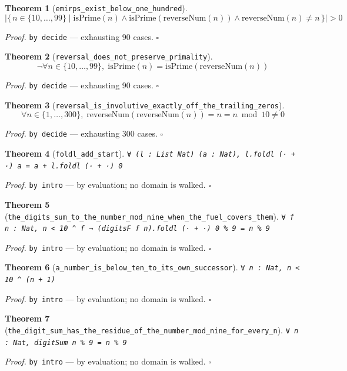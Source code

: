\documentclass[11pt]{article}
\newtheorem{theorem}{Theorem}[section]
\begin{document}
\begin{theorem}[\texttt{emirps\_exist\_below\_one\_hundred}]
\[ \left|\{\, n \in \{10,\dots,99\} \mid \mathrm{isPrime}\mathopen{}\left(n\right) \land \mathrm{isPrime}\mathopen{}\left(\mathrm{reverseNum}\mathopen{}\left(n\right)\right) \land \mathrm{reverseNum}\mathopen{}\left(n\right) \neq n \,\}\right| > 0 \]
\end{theorem}
\noindent\emph{Proof.} \texttt{by decide} --- exhausting 90 cases. \hfill$\square$

\begin{theorem}[\texttt{reversal\_does\_not\_preserve\_primality}]
\[ \lnot \forall n \in \{10,\dots,99\},\; \mathrm{isPrime}\mathopen{}\left(n\right) = \mathrm{isPrime}\mathopen{}\left(\mathrm{reverseNum}\mathopen{}\left(n\right)\right) \]
\end{theorem}
\noindent\emph{Proof.} \texttt{by decide} --- exhausting 90 cases. \hfill$\square$

\begin{theorem}[\texttt{reversal\_is\_involutive\_exactly\_off\_the\_trailing\_zeros}]
\[ \forall n \in \{1,\dots,300\},\; \mathrm{reverseNum}\mathopen{}\left(\mathrm{reverseNum}\mathopen{}\left(n\right)\right) = n = n \bmod 10 \neq 0 \]
\end{theorem}
\noindent\emph{Proof.} \texttt{by decide} --- exhausting 300 cases. \hfill$\square$

\begin{theorem}[\texttt{foldl\_add\_start}]
\texttt{∀ (l : List Nat) (a : Nat), l.foldl (· + ·) a = a + l.foldl (· + ·) 0}
\end{theorem}
\noindent\emph{Proof.} \texttt{by
  intro} --- by evaluation; no domain is walked. \hfill$\square$

\begin{theorem}[\texttt{the\_digits\_sum\_to\_the\_number\_mod\_nine\_when\_the\_fuel\_covers\_them}]
\texttt{∀ f n : Nat, n < 10 ^ f → (digitsF f n).foldl (· + ·) 0 \% 9 = n \% 9}
\end{theorem}
\noindent\emph{Proof.} \texttt{by
  intro} --- by evaluation; no domain is walked. \hfill$\square$

\begin{theorem}[\texttt{a\_number\_is\_below\_ten\_to\_its\_own\_successor}]
\texttt{∀ n : Nat, n < 10 ^ (n + 1)}
\end{theorem}
\noindent\emph{Proof.} \texttt{by
  intro} --- by evaluation; no domain is walked. \hfill$\square$

\begin{theorem}[\texttt{the\_digit\_sum\_has\_the\_residue\_of\_the\_number\_mod\_nine\_for\_every\_n}]
\texttt{∀ n : Nat, digitSum n \% 9 = n \% 9}
\end{theorem}
\noindent\emph{Proof.} \texttt{by
  intro} --- by evaluation; no domain is walked. \hfill$\square$
\end{document}

